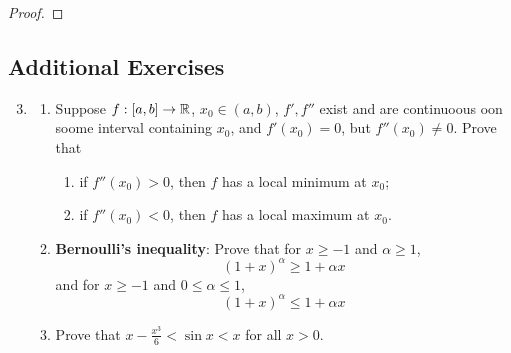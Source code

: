 \documentclass[../main.tex]{subfiles}
\begin{document}
\begin{exercise}
\begin{proof}
        
    \end{proof}
\end{exercise}

\subsection*{Additional Exercises}
\begin{enumerate}[ref={\thechapter.\arabic*}]
    \setcounter{enumi}{2}
    \item \label{axr:12.3}
    \begin{enumerate}[ref={\theenumi\alph*}]
        \item \label{axr:12.3a}Suppose $f:[a,b]\to\mathbb{R}$, $x_0\in(a,b)$, $f',f''$ exist and are continuoous oon soome interval containing $x_0$, and $f'(x_0)=0$, but $f''(x_0)\neq 0$. Prove that
        \begin{enumerate}[label={\roman*)},ref={\theenumii-\roman*}]
            \item \label{axr:12.3a-i}if $f''(x_0)>0$, then $f$ has a local minimum at $x_0$;
            \item \label{axr:12.3a-ii}if $f''(x_0)<0$, then $f$ has a local maximum at $x_0$.
        \end{enumerate}
        \item \label{axr:12.3b}\textbf{Bernoulli's inequality}: Prove that for $x\geq -1$ and $\alpha\geq 1$,
        \begin{equation*}
            (1+x)^\alpha \geq 1+\alpha x
        \end{equation*}
        and for $x\geq -1$ and $0\leq\alpha\leq 1$,
        \begin{equation*}
            (1+x)^\alpha \leq 1+\alpha x
        \end{equation*}
        \item \label{axr:12.3c}Prove that $x-\frac{x^3}{6}<\sin x<x$ for all $x>0$.
    \end{enumerate}
\end{enumerate}
\end{document}

